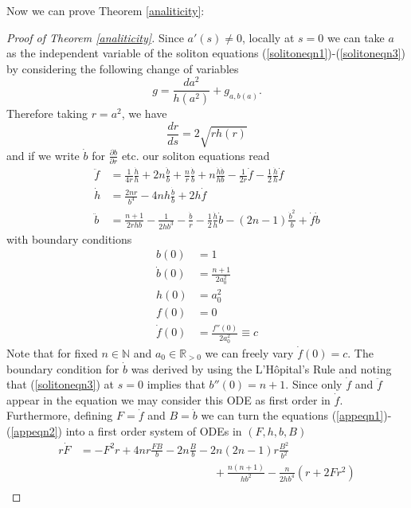 \documentclass{amsart}
\theoremstyle{definition}
\theoremstyle{remark}
\numberwithin{equation}{section}
\newcommand{\R}{\mathbb{R}}  %
\newcommand{\N}{\mathbb{N}}
\begin{document}
Now we can prove Theorem \ref{analiticity}:


\begin{proof}[Proof of Theorem \ref{analiticity}]
Since $a'(s) \neq 0$, locally at $s=0$ we can take $a$ as the independent variable of the soliton equations (\ref{solitoneqn1})-(\ref{solitoneqn3}) by considering the following change of variables 
\begin{equation*}
g = \frac{da^2}{h(a^2)} + g_{a,b(a)}.
\end{equation*}
Therefore taking $r = a^2$, we have
\begin{equation*}
\frac{dr}{ds} = 2 \sqrt{r h(r)}
\end{equation*}
and if we write $\dot{b}$ for $\frac{\partial b}{\partial r}$ etc. our soliton equations read
\begin{align}
\label{appeqn1}\ddot{f} &= \frac{1}{4r}\frac{\dot{h}}{h} + 2n \frac{\ddot{b}}{b} + \frac{n}{r}\frac{\dot{b}}{b} + n \frac{\dot{h}\dot{b}}{h b}  - \frac{1}{2r} \dot{f} - \frac{1}{2} \frac{\dot{h}}{h} \dot{f}\\
\dot{h} &= \frac{2n r}{ b^4} - 4nh \frac{\dot{b}}{b} + 2h \dot{f}\\
\label{appeqn2}\ddot{b} &= \frac{n+1}{2rhb} - \frac{1}{2hb^3} - \frac{\dot{b}}{r} - \frac{1}{2} \frac{\dot{h}}{h}\dot{b} - (2n-1) \frac{\dot{b}^2}{b} + \dot{f}\dot{b}
\end{align}
with boundary conditions 
\begin{align*}
b(0)&=1 \\
\dot{b}(0) &= \frac{n+1}{2a_0^2}\\
h(0) &= a_0^2\\
f(0) &=0\\
\dot{f}(0) &= \frac{f''(0)}{2 a_0^2} \equiv c
\end{align*}
Note that for fixed $n \in \N$ and $a_0\in\R_{>0}$ we can freely vary $\dot{f}(0) = c$. The boundary condition for $\dot{b}$ was derived by using the L'H\^opital's Rule and noting that (\ref{solitoneqn3}) at $s=0$ implies that $b''(0)=n+1$. Since only $\dot{f}$ and $\ddot{f}$ appear in the equation we may consider this ODE as first order in $\dot{f}$. Furthermore, defining $F = \dot{f}$ and $B = \dot{b}$ we can turn the equations (\ref{appeqn1})-(\ref{appeqn2}) into a first order system of ODEs in $(F,h,b,B)$ 
\begin{align*}
r\dot{F} &= -F^2r + 4nr \frac{FB}{b} - 2n\frac{B}{b} - 2n(2n-1)r \frac{B^2}{b^2} \\
\nonumber& \qquad\qquad\qquad\qquad\qquad\qquad+ \frac{n(n+1)}{hb^2} - \frac{n}{2hb^4}\left(r + 2 F r^2 \right) \\

\end{align*}
\end{proof}
\end{document}

